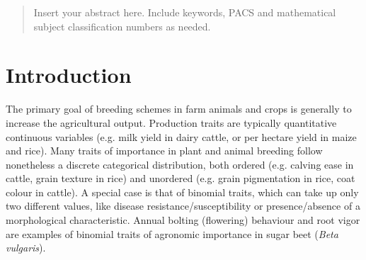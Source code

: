 

\date{Received:  / Accepted:}

\maketitle

\begin{abstract}
Insert your abstract here. Include keywords, PACS and mathematical
subject classification numbers as needed.
\end{abstract}

\section{Introduction}
\label{intro}
The primary goal of breeding schemes in farm animals and crops is
generally to increase the agricultural output. Production traits are
typically quantitative continuous variables (e.g. milk
yield in dairy cattle, or per hectare yield in maize and rice).
Many traits of importance in plant and animal breeding follow nonetheless
a discrete categorical distribution, both ordered (e.g. calving ease in
cattle, grain texture in rice) and unordered
(e.g. grain pigmentation in rice, coat colour in cattle). A special case
is that of binomial traits, which can take up only two different values,
like disease resistance/susceptibility or presence/absence of a
morphological characteristic. 
Annual bolting (flowering) behaviour and root vigor are examples of binomial traits of agronomic
importance in sugar beet (\emph{Beta vulgaris}). 

